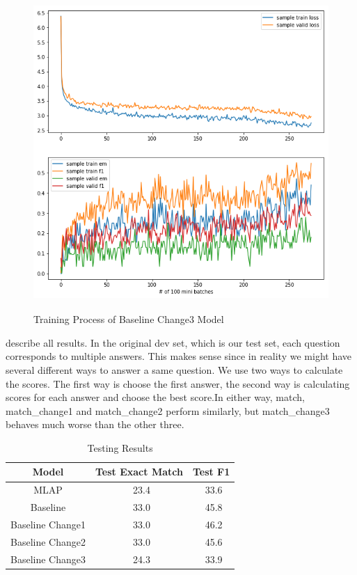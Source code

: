 \documentclass[modernstyle,12pt]{sjsuthesis}
\theoremstyle{definition}
\begin{document}
\begin{figure}[htbp]\centering
  \includegraphics[width=12cm, height=12cm]{figures/match_change3.png}
  \caption{Training Process of Baseline Change3 Model}
  \label{f:baseline_change3}
\end{figure}

describe all results. In the original dev set, which is our test set, each question corresponds to multiple answers. This makes sense since in reality we might have several different ways to answer a same question. We use two ways to calculate the scores. The first way is choose the first answer, the second way is calculating scores for each answer and choose the best score.In either way, match, match\_change1 and match\_change2 perform similarly, but match\_change3 behaves much worse than the other three.


\begin{table}[htbp]\centering
  \caption{Testing Results}
  \label{tab:test_results}
  \begin{tabular}{|c|c|c|}
    \hline
    Model& Test Exact Match & Test F1 \\
    \hline\hline
    MLAP & \ 23.4 &\ 33.6 \\
    Baseline & \ 33.0 &\ 45.8 \\
    Baseline Change1 & \ 33.0 &\ 46.2 \\
    Baseline Change2 & \ 33.0 &\ 45.6 \\
    Baseline Change3 & \ 24.3 &\ 33.9 \\
    \hline
  \end{tabular}
\end{table}
\end{document}

